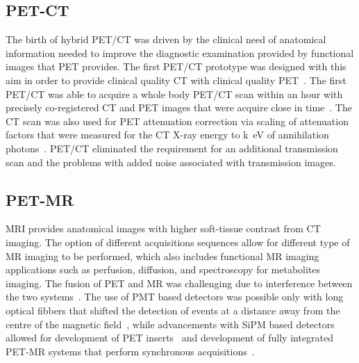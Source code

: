 \subsection{PET-CT}
The birth of hybrid PET/CT was driven by the clinical need of anatomical information needed to improve the diagnostic examination provided by functional images that PET provides. The first PET/CT prototype was designed with this aim in order to provide clinical quality CT with clinical quality PET~\cite{Townsend2008}. The first PET/CT was able to acquire a whole body PET/CT scan within an hour with precisely co-registered CT and PET images that were acquire close in time~\cite{Beyer2000}. The CT scan was also used for PET attenuation correction via scaling of attenuation factors that were measured for the CT X-ray energy to \si{k\electronvolt} of annihilation photons~\cite{Kinahan1998}. PET/CT eliminated the requirement for an additional transmission scan and the problems with added noise associated with transmission images. 

\subsection{PET-MR}
MRI provides anatomical images with higher soft-tissue contrast from CT imaging. The option of different acquisitions sequences allow for different type of MR imaging to be performed, which also includes functional MR imaging applications such as perfusion, diffusion, and spectroscopy for metabolites imaging. 
The fusion of PET and MR was challenging due to interference between the two systems~\cite{Disselhorst2014}. The use of PMT based detectors was possible only with long optical fibbers that shifted the detection of events at a distance away from the centre of the magnetic field~\cite{Shao1997,Mackewn2010}, while advancements with SiPM based detectors allowed for development of PET inserts~\cite{Kolb2012} and development of fully integrated PET-MR systems that perform synchronous acquisitions~\cite{Delso2011,Grant2016,Levin2016}.


